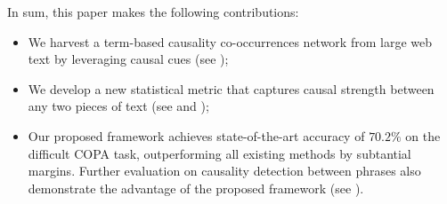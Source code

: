 In sum, this paper makes the following contributions:
\begin{itemize}
\item We harvest a term-based causality co-occurrences network from large
web text by leveraging causal cues (see );
\item We develop a new statistical metric that captures causal strength
between any two pieces of text (see 
and );

\item Our proposed framework achieves state-of-the-art accuracy of $70.2\%$
on the difficult COPA task, outperforming all existing methods by subtantial margins.
Further evaluation on causality detection between phrases also
demonstrate the advantage of the proposed framework (see ).
\end{itemize}
